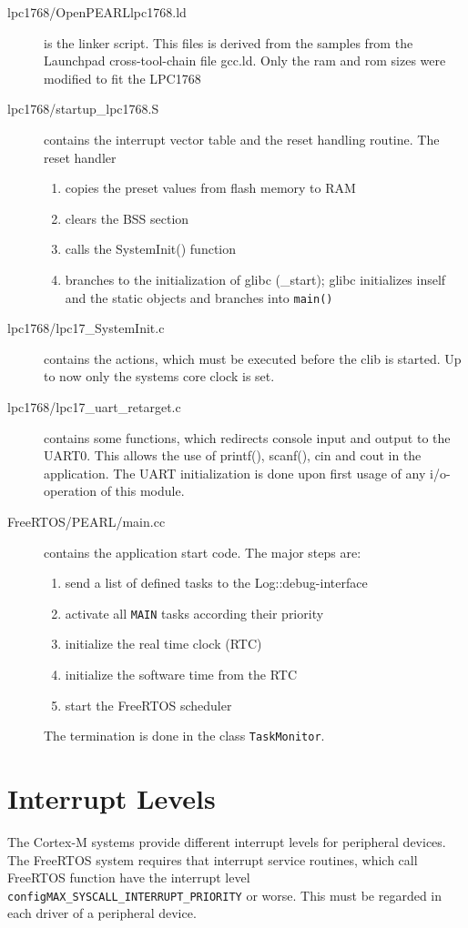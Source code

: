 \begin{description}
\item[lpc1768/OpenPEARLlpc1768.ld] is the linker script. This files is derived from
   the samples from the Launchpad cross-tool-chain file gcc.ld. 
   Only the ram and rom sizes were modified to fit the LPC1768 
\item[lpc1768/startup\_lpc1768.S] contains the interrupt vector table and the 
   reset handling routine. The reset handler 
   \begin{enumerate}
   \item copies the preset values from flash memory to RAM
   \item clears the BSS section 
   \item  calls the SystemInit() function
   \item  branches to the initialization of glibc (\_start); glibc
      initializes inself and the static objects and branches into \verb|main()|
   \end{enumerate}
\item[lpc1768/lpc17\_SystemInit.c] contains the actions, which must be executed
   before the clib is started. Up to now only the systems core clock is 
   set.
\item [lpc1768/lpc17\_uart\_retarget.c] contains some functions, which redirects console 
   input and output to the UART0.  This allows the use of printf(), 
   scanf(), cin and cout in the application. The UART initialization is done 
   upon first usage of any i/o-operation of this module.
\item[FreeRTOS/PEARL/main.cc] contains the application start code.
 The major steps are:
  \begin{enumerate}
  \item send a list of defined tasks to the Log::debug-interface
  \item activate all \verb|MAIN| tasks according their priority
  \item initialize the real time clock (RTC)
  \item initialize the software time from the RTC
  \item start the FreeRTOS scheduler 
  \end{enumerate}
  The termination is done in the class \verb|TaskMonitor|. 
\end{description}

\section{Interrupt Levels}
The Cortex-M systems provide different interrupt levels for peripheral devices.
The FreeRTOS system requires that interrupt service routines, which call
FreeRTOS function have the interrupt level 
\texttt{configMAX\_SYSCALL\_INTERRUPT\_PRIORITY} or worse. 
This must be regarded in each driver of a peripheral device.

